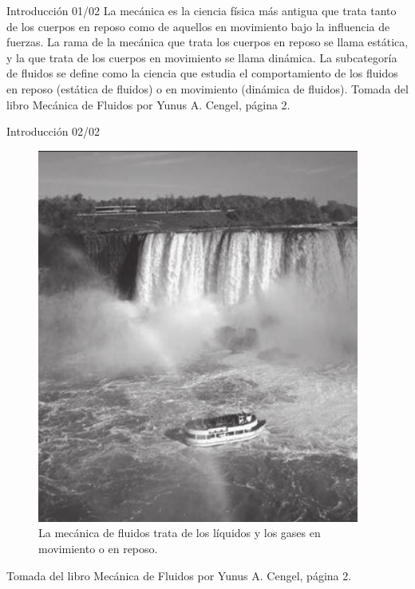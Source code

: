\begin{frame}{Introducción 01/02}
\justifying
La mecánica es la ciencia física más antigua que trata tanto de los cuerpos en reposo como de aquellos en movimiento bajo la influencia de fuerzas. La rama de la mecánica que trata los cuerpos en reposo se llama estática, y la que trata de los cuerpos en movimiento se llama dinámica. La subcategoría de fluidos se define como la ciencia que estudia el comportamiento de los fluidos en reposo (estática de fluidos) o en movimiento (dinámica de fluidos).
{\tiny Tomada del libro Mecánica de Fluidos por Yunus A. Cengel, página 2.}
\end{frame}
	
\begin{frame}{Introducción 02/02}
\justifying
\begin{figure}[H]
\centering
\includegraphics[scale=0.2]{Section_Files/imagenes/sec01_0101_Fig01-01.png}
\caption{La mecánica de fluidos trata de los líquidos y los gases en movimiento o en reposo.}
\label{fig: Figura1-01}
\end{figure}
{\tiny Tomada del libro Mecánica de Fluidos por Yunus A. Cengel, página 2.}
\end{frame}	

